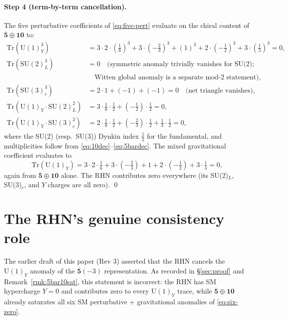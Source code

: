 \paragraph{Step 4 (term-by-term cancellation).}
The five perturbative coefficients of \eqref{eq:five-pert} evaluate
on the chiral content of $\overline{\mathbf{5}}\oplus\mathbf{10}$ to:
\begin{align}
  \mathrm{Tr}(\mathrm{U}(1)_Y^3) &=
    3 \cdot 2 \cdot (\tfrac{1}{6})^3
    + 3\cdot(-\tfrac{2}{3})^3
    + (1)^3
    + 2\cdot(-\tfrac{1}{2})^3
    + 3\cdot(\tfrac{1}{3})^3 = 0, \\
  \mathrm{Tr}(\mathrm{SU}(2)_L^3) &= 0
    \quad\text{(symmetric anomaly trivially vanishes for SU(2);}\\
  &\quad\text{Witten global anomaly is a separate mod-$2$ statement)}, \nonumber\\
  \mathrm{Tr}(\mathrm{SU}(3)_c^3) &=
    2\cdot 1 + (-1) + (-1) = 0
    \quad\text{(net triangle vanishes)}, \\
  \mathrm{Tr}(\mathrm{U}(1)_Y \cdot \mathrm{SU}(2)_L^2) &=
    3\cdot \tfrac{1}{6} \cdot \tfrac{1}{2}
    + (-\tfrac{1}{2}) \cdot \tfrac{1}{2} = 0, \\
  \mathrm{Tr}(\mathrm{U}(1)_Y \cdot \mathrm{SU}(3)_c^2) &=
    2 \cdot \tfrac{1}{6} \cdot \tfrac{1}{2}
    + (-\tfrac{2}{3})\cdot \tfrac{1}{2}
    + \tfrac{1}{3}\cdot \tfrac{1}{2} = 0,
\end{align}
where the SU(2) (resp.\ SU(3)) Dynkin index $\tfrac{1}{2}$ for the
fundamental, and multiplicities follow from
\eqref{eq:10dec}--\eqref{eq:5bardec}. The mixed gravitational
coefficient evaluates to
\begin{equation}\label{eq:trY-zero}
  \mathrm{Tr}(\mathrm{U}(1)_Y) =
    3\cdot 2 \cdot \tfrac{1}{6}
    + 3\cdot(-\tfrac{2}{3})
    + 1
    + 2\cdot(-\tfrac{1}{2})
    + 3\cdot \tfrac{1}{3} = 0,
\end{equation}
again from $\overline{\mathbf{5}}\oplus\mathbf{10}$ alone. The RHN
contributes zero everywhere (its SU(2)$_L$, SU(3)$_c$, and $Y$
charges are all zero). \qed

\section{The RHN's genuine consistency role}\label{sec:rhn-genuine-role}
The earlier draft of this paper (Rev 3) asserted that the RHN cancels
the $\mathrm{U}(1)_Y$ anomaly of the $\overline{\mathbf{5}}(-3)$
representation. As recorded in \S\ref{sec:proof} and
Remark~\ref{rmk:5bar10sat}, this statement is incorrect: the RHN has
SM hypercharge $Y=0$ and contributes zero to every $\mathrm{U}(1)_Y$
trace, while $\overline{\mathbf{5}}\oplus\mathbf{10}$ already saturates
all six SM perturbative + gravitational anomalies of
\eqref{eq:six-zero}.

